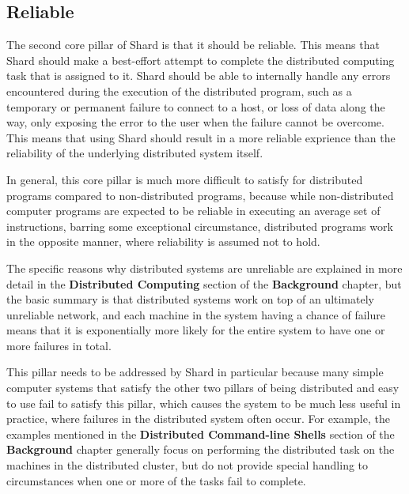 \documentclass[twoside]{report}
\begin{document}
\subsection{Reliable}

The second core pillar of Shard is that it should be reliable.
This means that Shard should make a best-effort attempt to complete the distributed computing task that is assigned to it.
Shard should be able to internally handle any errors encountered during the execution of the distributed program, such as a temporary or permanent failure to connect to a host, or loss of data along the way, only exposing the error to the user when the failure cannot be overcome.
This means that using Shard should result in a more reliable exprience than the reliability of the underlying distributed system itself.

In general, this core pillar is much more difficult to satisfy for distributed programs compared to non-distributed programs, because while non-distributed computer programs are expected to be reliable in executing an average set of instructions, barring some exceptional circumstance, distributed programs work in the opposite manner, where reliability is assumed not to hold.

The specific reasons why distributed systems are unreliable are explained in more detail in the \textbf{Distributed Computing} section of the \textbf{Background} chapter, but the basic summary is that distributed systems work on top of an ultimately unreliable network, and each machine in the system having a chance of failure means that it is exponentially more likely for the entire system to have one or more failures in total.

This pillar needs to be addressed by Shard in particular because many simple computer systems that satisfy the other two pillars of being distributed and easy to use fail to satisfy this pillar, which causes the system to be much less useful in practice, where failures in the distributed system often occur.
For example, the examples mentioned in the \textbf{Distributed Command-line Shells} section of the \textbf{Background} chapter generally focus on performing the distributed task on the machines in the distributed cluster, but do not provide special handling to circumstances when one or more of the tasks fail to complete.
\end{document}
